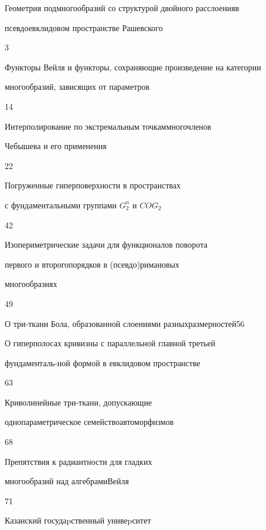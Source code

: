 

{Геометрия подмногообразий со структурой двойного расслоения\newline в


псевдоевклидовом пространстве Рашевского}{3}




{Функторы Вейля и функторы, сохраняющие произведение на категории\newline


многообразий, зависящих от параметров}{14}




{Интерполирование по экстремальным точкам\newline многочленов 


Чебышева и его применения}{22}




{Погруженные гиперповерхности в пространствах\newline


с фундаментальными группами $G_2^n$ и $COG_2$}{42}




{Изопериметрические задачи для функционалов  поворота  


первого и второго\newline порядков в (псевдо)римановых


многообразиях}{49}




{О три-ткани Бола, образованной слоениями разных\newline размерностей}{56}




{О гиперполосах кривизны с параллельной главной третьей


фундаменталь-\newline ной формой в евклидовом пространстве}{63}




{Криволинейные три-ткани, допускающие  


однопараметрическое семейство\newline автоморфизмов}{68}




{Препятствия  к радиантности для гладких 


многообразий над алгебрами\newline Вейля}{71}











\vfill


\noindent\raisebox{2pt}{\copyright} Казанский госудаpственный унивеpситет






